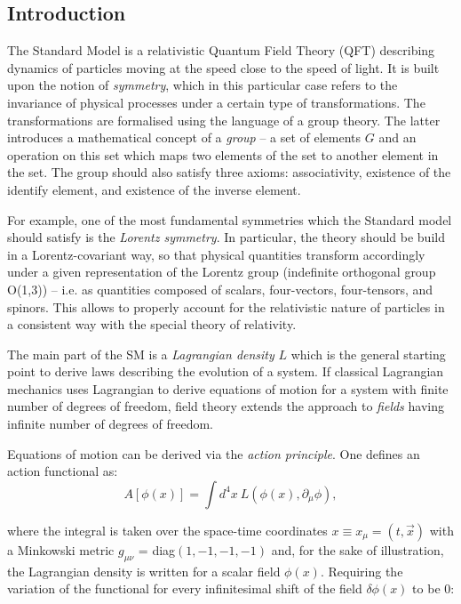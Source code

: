 \subsection{Introduction}\label{sec:lagr-intro}
The Standard Model is a relativistic Quantum Field Theory (QFT) describing dynamics of particles moving at the speed close to the speed of light. It is built upon the notion of \textit{symmetry}, which in this particular case refers to the invariance of physical processes under a certain type of transformations. The transformations are formalised using the language of a group theory. The latter introduces a mathematical concept of a \textit{group} -- a set of elements $G$ and an operation on this set which maps two elements of the set to another element in the set. The group should also satisfy three axioms: associativity, existence of the identify element, and existence of the inverse element.

For example, one of the most fundamental symmetries which the Standard model should satisfy is the \textit{Lorentz symmetry}. In particular, the theory should be build in a Lorentz-covariant way, so that physical quantities transform accordingly under a given representation of the Lorentz group (indefinite orthogonal group O(1,3)) -- i.e. as quantities composed of scalars, four-vectors, four-tensors, and spinors. This allows to properly account for the relativistic nature of particles in a consistent way with the special theory of relativity. 

The main part of the SM is a \textit{Lagrangian density} $L$ which is the general starting point to derive laws describing the evolution of a system. If classical Lagrangian mechanics uses Lagrangian to derive equations of motion for a system with finite number of degrees of freedom, field theory extends the approach to \textit{fields} having infinite number of degrees of freedom.

Equations of motion can be derived via the \textit{action principle}. One defines an action functional as: 
\begin{equation}
    A[\phi(x)] = \int d^4x ~L(\phi(x), \partial_\mu\phi), 
\end{equation}

where the integral is taken over the space-time coordinates $x \equiv x_\mu = (t, \vec{x})$ with a Minkowski metric $g_{\mu\nu}$ = diag$(1, -1, -1, -1)$ and, for the sake of illustration, the Lagrangian density is written for a scalar field $\phi(x)$. Requiring the variation of the functional for every infinitesimal 
shift of the field $\delta\phi(x)$ to be 0:

